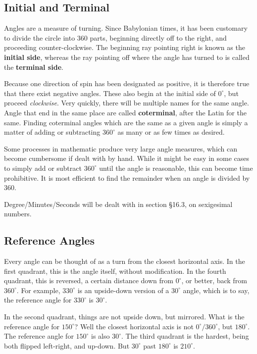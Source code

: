 
\subsection{Initial and Terminal}



Angles are a measure of turning.  Since Babylonian times, it has been customary to divide
the circle into 360 parts, beginning directly off to the right, and proceeding counter-clockwise.
The beginning ray pointing right is known as the \textbf{initial side}, whereas the ray pointing
off where the angle has turned to is called the \textbf{terminal side}.

Because one direction of spin has been designated as positive, it is therefore true that
there exist negative angles.  These also begin at the initial side of $0^\circ$, but proceed
\emph{clockwise}.  Very quickly, there will be multiple names for the same angle.
Angle that end in the same place are called \textbf{coterminal}, after the Latin for the same.
Finding coterminal angles which are the same as a given angle is simply a matter of
adding or subtracting $360^\circ$ as many or as few times as desired.

Some processes in mathematic produce very large angle measures, which can become
cumbersome if dealt with by hand.  While it might be easy in some cases to simply
add or subtract $360^\circ$ until the angle is reasonable, this can become time prohibitive.
It is most efficient to find the remainder when an angle is divided by 360.

Degree/Minutes/Seconds will be dealt with in section §16.3, on sexigesimal numbers.

\subsection{Reference Angles}
Every angle can be thought of as a turn from the closest horizontal axis.  In the 
first quadrant, this is the angle itself, without modification.  In the fourth quadrant,
this is reversed, a certain distance down from $0^\circ$, or better, back from 
$360^\circ$.  For example, $330^\circ$ is an upside-down version of a $30^\circ$
angle, which is to say, the reference angle for $330^\circ$ is $30^\circ$.

In the second quadrant, things are not upside down, but mirrored.  What is the reference
angle for $150^\circ$?  Well the closest horizontal axis is not $0^\circ/360^\circ$, but
$180^\circ$.  The reference angle for $150^\circ$ is also $30^\circ$.  The third quadrant
is the hardest, being both flipped left-right, and up-down.  But $30^\circ$ past
$180^\circ$ is $210^\circ$.

